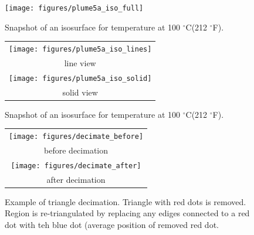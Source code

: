 \documentclass[11pt,twoside]{book}
\newcommand{\degF}{$^\circ$F}
\newcommand{\degC}{$^\circ$C}
\newcommand{\figoptions}{P}
\begin{document}
\begin{figure}[\figoptions]
\begin{center}
\texttt{[image: figures/plume5a\_iso\_full]}\\
\end{center}
\caption{Snapshot of an isosurface for temperature at 100 \degC (212 \degF).
  }
\label{figiso}%
\end{figure}

\begin{figure}[\figoptions]
\begin{center}
\begin{tabular}{c}
\texttt{[image: figures/plume5a\_iso\_lines]}\\
line view\\
\texttt{[image: figures/plume5a\_iso\_solid]}\\
solid view
\end{tabular}
\end{center}
\caption{Snapshot of an isosurface for temperature at 100 \degC (212 \degF).
  }
\label{figiso}%
\end{figure}

\begin{figure}[\figoptions]
\begin{center}
\begin{tabular}{c}
\texttt{[image: figures/decimate\_before]}\\
before decimation\\
\texttt{[image: figures/decimate\_after]}\\
after decimation
\end{tabular}
\end{center}
\caption[Example of triangle decimation.]{Example of triangle decimation.  Triangle with red dots is removed.  Region is re-triangulated by replacing any ediges connected to a red dot with teh blue dot (average position of removed red dot.}
\label{figdecimate}%
\end{figure}
\end{document}

